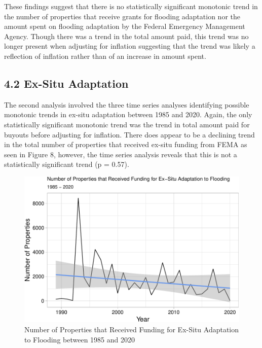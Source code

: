 \documentclass[
  12pt,
]{article}
\begin{document}
These findings suggest that there is no statistically significant
monotonic trend in the number of properties that receive grants for
flooding adaptation nor the amount spent on flooding adaptation by the
Federal Emergency Management Agency. Though there was a trend in the
total amount paid, this trend was no longer present when adjusting for
inflation suggesting that the trend was likely a reflection of inflation
rather than of an increase in amount spent. \newline

\hypertarget{ex-situ-adaptation}{%
\subsection{4.2 Ex-Situ Adaptation}\label{ex-situ-adaptation}}

The second analysis involved the three time series analyses identifying
possible monotonic trends in ex-situ adaptation between 1985 and 2020.
Again, the only statistically significant monotonic trend was the trend
in total amount paid for buyouts before adjusting for inflation. There
does appear to be a declining trend in the total number of properties
that received ex-situ funding from FEMA as seen in Figure 8, however,
the time series analysis reveals that this is not a statistically
significant trend (p = 0.57).

\newline

\begin{figure}
\centering
\includegraphics{finalreport_files/figure-latex/unnamed-chunk-14-1.pdf}
\caption{Number of Properties that Received Funding for Ex-Situ
Adaptation to Flooding between 1985 and 2020}
\end{figure}
\end{document}
